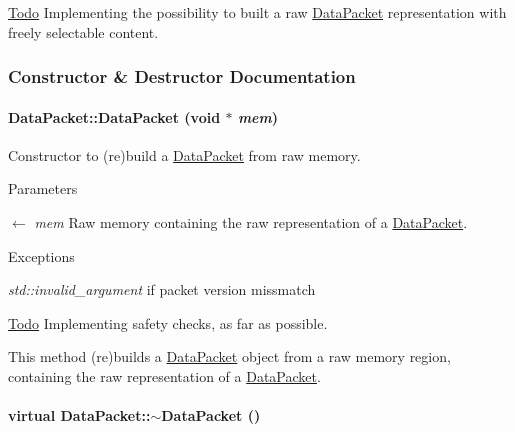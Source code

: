 \begin{Desc}
\item[\hyperlink{todo__todo000001}{Todo}]Implementing the possibility to built a raw \hyperlink{class_data_packet}{DataPacket} representation with freely selectable content. \end{Desc}


\subsubsection{Constructor \& Destructor Documentation}
\hypertarget{class_data_packet_abcb0afec0bf5e6c21175f25d7911b1d7}{
\paragraph[{DataPacket}]{\setlength{\rightskip}{0pt plus 5cm}DataPacket::DataPacket (void $\ast$ {\em mem})}\hfill}
\label{class_data_packet_abcb0afec0bf5e6c21175f25d7911b1d7}


Constructor to (re)build a \hyperlink{class_data_packet}{DataPacket} from raw memory. 
\begin{DoxyParams}{Parameters}
\item[\mbox{$\leftarrow$} {\em mem}]Raw memory containing the raw representation of a \hyperlink{class_data_packet}{DataPacket}. \end{DoxyParams}

\begin{DoxyExceptions}{Exceptions}
\item[{\em std::invalid\_\-argument}]if packet version missmatch \end{DoxyExceptions}
\begin{Desc}
\item[\hyperlink{todo__todo000002}{Todo}]Implementing safety checks, as far as possible.\end{Desc}
This method (re)builds a \hyperlink{class_data_packet}{DataPacket} object from a raw memory region, containing the raw representation of a \hyperlink{class_data_packet}{DataPacket}. \hypertarget{class_data_packet_a6865aaea072c8af4caf7e4cb6baa0155}{
\paragraph[{$\sim$DataPacket}]{\setlength{\rightskip}{0pt plus 5cm}virtual DataPacket::$\sim$DataPacket ()}\hfill}
\label{class_data_packet_a6865aaea072c8af4caf7e4cb6baa0155}


